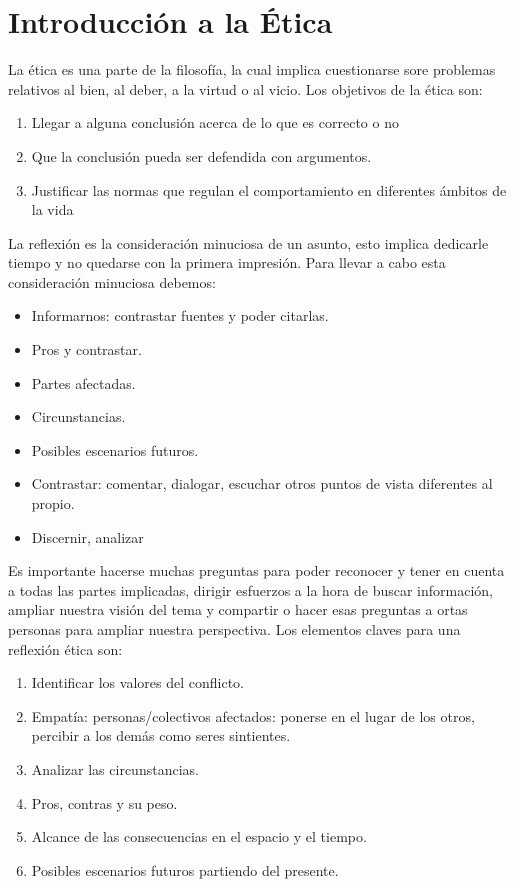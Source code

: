 
\section{Introducción a la Ética}
La ética es una parte de la filosofía, la cual implica cuestionarse sore problemas relativos al bien, al deber, a la virtud o al vicio.
Los objetivos de la ética son:
\begin{enumerate}
    \item Llegar a alguna conclusión acerca de lo que es correcto o no
    \item Que la conclusión pueda ser defendida con argumentos.
    \item Justificar las normas que regulan el comportamiento en diferentes ámbitos de la vida
\end{enumerate}


La reflexión es la consideración minuciosa de un asunto, esto implica dedicarle tiempo y no quedarse con la primera impresión. Para llevar a cabo esta consideración minuciosa debemos:
\begin{itemize}
    \item Informarnos: contrastar fuentes y poder citarlas.
    \item Pros y contrastar.
    \item Partes afectadas.
    \item Circunstancias.
    \item Posibles escenarios futuros.
    \item Contrastar: comentar, dialogar, escuchar otros puntos de vista diferentes al propio.
    \item Discernir, analizar
\end{itemize}

Es importante hacerse muchas preguntas para poder reconocer y tener en cuenta a todas las partes implicadas, dirigir esfuerzos a la hora de buscar información, ampliar nuestra visión del tema y compartir o hacer esas preguntas a ortas personas para ampliar nuestra perspectiva.
Los elementos claves para una reflexión ética son:
\begin{enumerate}
    \item Identificar los valores del conflicto.
    \item Empatía: personas/colectivos afectados: ponerse en el lugar de los otros, percibir a los demás como seres sintientes.
    \item Analizar las circunstancias.
    \item Pros, contras y su peso.
    \item Alcance de las consecuencias en el espacio y el tiempo.
    \item Posibles escenarios futuros partiendo del presente.
\end{enumerate}

